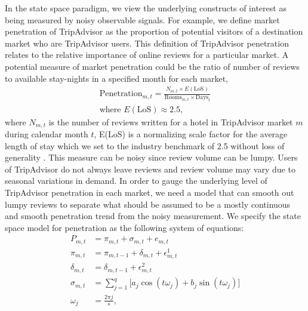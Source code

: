 \documentclass[mksc,blindrev]{informs3} %
\begin{document}
In the state space paradigm, we view the underlying constructs of interest as being measured by noisy observable signals. For example, we define market penetration of TripAdvisor as the proportion of potential visitors of a destination market who are TripAdvisor users. This definition of TripAdvisor penetration relates to the relative importance of online reviews for a particular market. A potential measure of market penetration could be the ratio of number of reviews to available stay-nights in a specified month for each market,
\begin{equation}\label{eq:penetration}
\begin{split}
\text{Penetration}_{m,t}=\frac{N_{m,t}\times E({\text{LoS}})}{\text{Rooms}_{m,t}\times \text{Days}_t} \\
\text{where } E({\text{LoS}})\approx 2.5,
\end{split}
\end{equation}
where $N_{m,t}$ is the number of reviews written for a hotel in TripAdvisor market $m$ during calendar month $t$, E(LoS) is a normalizing scale factor for the average length of stay which we set to the industry benchmark of 2.5 without loss of generality \citep{expediapackage2017}. This measure can be noisy since review volume can be lumpy. Users of TripAdvisor do not always leave reviews and review volume may vary due to seasonal variations in demand. In order to gauge the underlying level of TripAdvisor penetration in each market, we need a model that can smooth out lumpy reviews to separate what should be assumed to be a mostly continuous and smooth penetration trend from the noisy measurement. We specify the state space model for penetration as the following system of equations:
\begin{equation}\label{eq:penetration_dlm}
\begin{split}
P_{m,t}&=\pi_{m,t}+\sigma_{m,t}+e_{m,t}\\
\pi_{m,t}&=\pi_{m,t-1}+\delta_{m,t}+\epsilon_{m,t}^{1} \\
\delta_{m,t} &= \delta_{m,t-1} +\epsilon_{m,t}^{2} \\
\sigma_{m,t} &= \sum_{j=1}^{q}\big[a_j\cos(t\omega_j)+b_j\sin(t\omega_j)\big] \\
\omega_j &= \frac{2\pi j}{s},
\end{split}
\end{equation}
\end{document}
